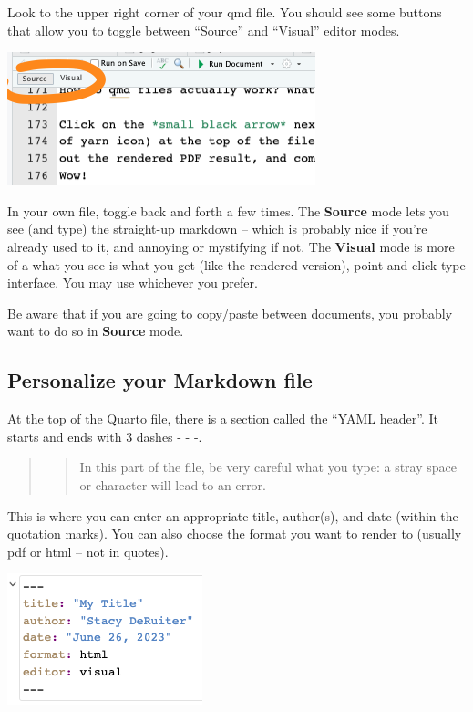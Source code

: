 \documentclass[
  letterpaper,
  DIV=11,
  numbers=noendperiod]{scrreprt}
\theoremstyle{remark}
\begin{document}
Look to the upper right corner of your qmd file. You should see some
buttons that allow you to toggle between ``Source'' and ``Visual''
editor modes.

\includegraphics[width=0.6\linewidth,height=\textheight,keepaspectratio]{images/source-visual.png}

In your own file, toggle back and forth a few times. The \textbf{Source}
mode lets you see (and type) the straight-up markdown -- which is
probably nice if you're already used to it, and annoying or mystifying
if not. The \textbf{Visual} mode is more of a
what-you-see-is-what-you-get (like the rendered version),
point-and-click type interface. You may use whichever you prefer.

Be aware that if you are going to copy/paste between documents, you
probably want to do so in \textbf{Source} mode.

\subsection{Personalize your Markdown
file}\label{personalize-your-markdown-file}

At the top of the Quarto file, there is a section called the ``YAML
header''. It starts and ends with 3 dashes - - -.

\begin{quote}
\begin{quote}
In this part of the file, be very careful what you type: a stray space
or character will lead to an error.
\end{quote}
\end{quote}

This is where you can enter an appropriate title, author(s), and date
(within the quotation marks). You can also choose the format you want to
render to (usually pdf or html -- not in quotes).

\includegraphics[width=0.4\linewidth,height=\textheight,keepaspectratio]{images/yaml.png}
\end{document}
